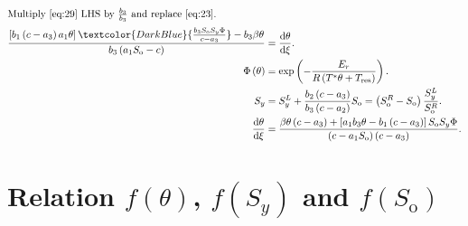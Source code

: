 \documentclass[
    8pt,
    aspectratio=1610,
    c,
    intlimits,
    leqno,
    professionalfonts,
]{beamer}
\begin{document}
\begin{frame}
	\frametitle{\secname}

	\begin{align}
		\shortintertext{Multiply~\eqref{eq:29} LHS by
			$\frac{b_{3}}{b_{3}}$ and replace~\eqref{eq:23}.}
		\frac{
		\left[
			b_{1}
			\left(c-a_{3}\right)
			a_{1}\theta
			\right]
		\textcolor{DarkBlue}{
		\frac{
		b_{3}
		S_{\text{o}}
		S_{y}
		\Phi
		}{c-a_{3}}
		}
		-b_{3}\beta\theta
		}{
		b_{3}
		\left(
		a_{1}S_{\text{o}}-c
		\right)
		}                       & =
		\diff{\theta}{\xi}.\notag   \\
		\setcounter{equation}{33}
		\Phi\left(\theta\right) & =
		\exp
		\left(
		-\frac{E_{r}}{
			R\left(T^{\ast}\theta+T_{\text{res}}\right)
		}
		\right).\label{eq:34}       \\
		S_{y}                   & =
		S^{L}_{y}+
		\frac{b_{2}\left(c-a_{3}\right)}{b_{3}\left(c-a_{2}\right)}
		S_{\text{o}}=
		\left(
		S^{R}_{\text{o}}-
		S_{\text{o}}
		\right)
		\frac{S^{L}_{y}}{S^{R}_{\text{o}}}.
		\label{eq:35}               \\
		\diff{\theta}{\xi}
		                        & =
		\frac{
			\beta\theta
			\left(c-a_{3}\right)+
			\left[
				a_{1}
				b_{3}
				\theta-
				b_{1}
				\left(c-a_{3}\right)
				\right]
			S_{\text{o}}
			S_{y}
			\Phi}{
			\left(c-a_{1}S_{\text{o}}\right)
			\left(c-a_{3}\right)
		}.\label{eq:36}
	\end{align}
\end{frame}

\section{Relation $f\left(\theta\right)$, $f\left(S_{y}\right)$ and
  $f\left(S_{\text{o}}\right)$}
\end{document}
